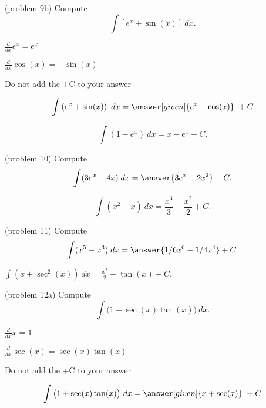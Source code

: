 \documentclass{ximera}
\begin{document}
\begin{problem}(problem 9b)
Compute
\[
\int \left[e^x + \sin(x) \right] \ dx.
\]

\begin{hint}
$\frac{d}{dx} e^x = e^x$
\end{hint}
\begin{hint}
$\frac{d}{dx} \cos(x) = -\sin(x)$
\end{hint}
\begin{hint}
\begin{center}
Do not add the +C to your answer
\end{center}
\end{hint}

\[
\int \left(e^x + \sin(x) \right) \ dx =
\answer[given]{e^x -\cos(x)} \ +  C
\]
\end{problem}


\begin{example}[example 10]
\[
\int \left(1 - e^x\right) \ dx = x - e^x + C.
\]
\end{example}

\begin{problem}(problem 10)
Compute
\[
\int (3e^x - 4x) \; dx = \answer{3e^x - 2x^2} + C.
\]
\end{problem}



\begin{example}[example 11]
\[
\int \left(x^2 - x\right) \ dx = \dfrac{x^3}{3} - \dfrac{x^2}{2} + C.
\]
\end{example}


\begin{problem}(problem 11)
Compute
\[
\int (x^5 - x^3) \; dx = \answer{1/6 x^6 - 1/4 x^4} + C.
\]
\end{problem}




\begin{example}[example 12]
$\int \left(x + \sec^2(x)\right) \ dx = \frac{x^2}{2} + \tan(x) + C.$
\end{example}

\begin{problem}(problem 12a)
Compute
\[
\int \big(1 + \sec(x)\tan(x) \big) \ dx.
\]

\begin{hint}
$\frac{d}{dx} x = 1$
\end{hint}
\begin{hint}
$\frac{d}{dx} \sec(x) = \sec(x)\tan(x)$
\end{hint}
\begin{hint}
\begin{center}
Do not add the +C to your answer
\end{center}
\end{hint}

\[
\int \big(1 + \sec(x)\tan(x) \big) \ dx =
\answer[given]{x + \sec(x)} \ +  C
\]
\end{problem}
\end{document}

